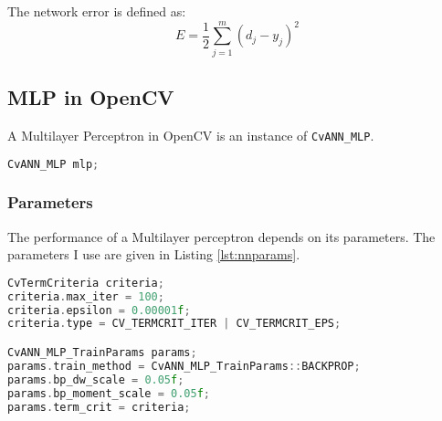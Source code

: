 The network error is defined as:
$$E = \frac{1}{2} \sum_{j=1}^{m}{(d_j - y_j)^2} $$

\subsection{MLP in OpenCV}
A Multilayer Perceptron in OpenCV is an instance of \lstinline|CvANN_MLP|.

\begin{lstlisting}[language=C++]
CvANN_MLP mlp;
\end{lstlisting}

\subsubsection*{Parameters}
The performance of a Multilayer perceptron depends on its parameters. The parameters I use are given in Listing \ref{lst:nnparams}.

\begin{lstlisting}[label=lst:nnparams, language=C++]
CvTermCriteria criteria;
criteria.max_iter = 100;
criteria.epsilon = 0.00001f;
criteria.type = CV_TERMCRIT_ITER | CV_TERMCRIT_EPS;

CvANN_MLP_TrainParams params;
params.train_method = CvANN_MLP_TrainParams::BACKPROP;
params.bp_dw_scale = 0.05f;
params.bp_moment_scale = 0.05f;
params.term_crit = criteria;
\end{lstlisting}

